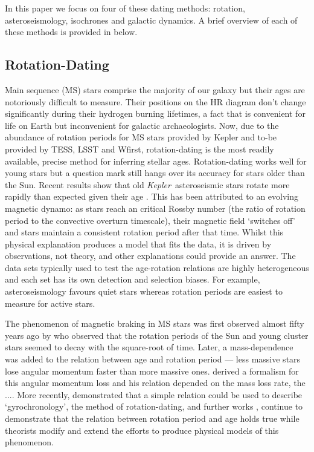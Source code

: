 \documentclass[useAMS, usenatbib, preprint, 12pt]{aastex}
\newcommand{\Kepler}{{\it Kepler}}
\newcommand{\kepler}{\Kepler}
\newcommand{\eg}{{\it e.g.}}
\begin{document}
In this paper we focus on four of these dating methods: rotation,
asteroseismology, isochrones and galactic dynamics.
A brief overview of each of these methods is provided in below.

\subsection{Rotation-Dating}
\label{sec:rotation}

Main sequence (MS) stars comprise the majority of our galaxy but their ages
are notoriously difficult to measure.
Their positions on the HR diagram don't change significantly during their
    hydrogen burning lifetimes, a fact that is convenient for life on Earth
    but inconvenient for galactic archaeologists.
Now, due to the abundance of rotation periods for MS stars provided by Kepler
    and to-be provided by TESS, LSST and Wfirst, rotation-dating is the most
    readily available, precise method for inferring stellar ages.
Rotation-dating works well for young stars but a question mark still hangs
    over its accuracy for stars older than the Sun.
Recent results show that old \kepler\ asteroseismic stars rotate more rapidly
    than expected given their age \citep[\eg][]{Angus2015, Vansaders2016,
    Metcalfe2016}.
This has been attributed to an evolving magnetic dynamo: as stars reach an
    critical Rossby number (the ratio of rotation period to the convective
    overturn timescale), their magnetic field `switches off' and stars
    maintain a consistent rotation period after that time.
Whilst this physical explanation produces a model that fits the data, it
    is driven by observations, not theory, and other explanations could
    provide an answer.
The data sets typically used to test the age-rotation relations are highly
    heterogeneous and each set has its own detection and selection biases.
For example, asteroseismology favours quiet stars whereas rotation periods are
    easiest to measure for active stars.

The phenomenon of magnetic braking in MS stars was first observed almost fifty
years ago by \citet{Skumanich1972} who observed that the rotation periods of
the Sun and young cluster stars seemed to decay with the square-root of time.
Later, a mass-dependence was added to the relation between age and rotation
period --- less massive stars lose angular momentum faster than more massive
ones.
\citet{Kawaler1988} derived a formalism for this angular momentum loss and his
relation depended on the mass loss rate, the ....
More recently, \citet{Barnes2003} demonstrated that a simple relation could be
used to describe `gyrochronology', the method of rotation-dating, and further
works \citep[\eg][]{Barnes2007, Mamajek2008, Barnes2010, Meibom2011},
continue to demonstrate that the relation between rotation period and age
holds true while theorists \citep[\eg][]{Matt2012, Epstein2014} modify and
extend the efforts to produce physical models of this phenomenon.
\end{document}
